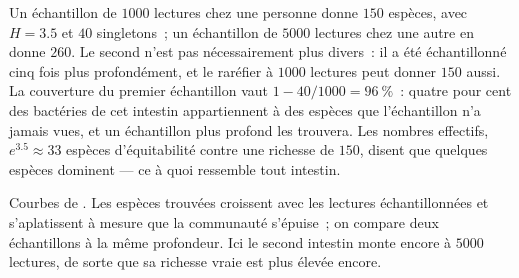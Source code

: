 \begin{example}\label{ex:b3:microbiomes:two-guts}
Un échantillon de $1000$ lectures chez une personne donne $150$
espèces, avec $H = 3.5$ et $40$ singletons~; un échantillon de $5000$
lectures chez une autre en donne $260$. Le second n'est pas
nécessairement plus divers~: il a été échantillonné cinq fois plus
profondément, et le raréfier à $1000$ lectures peut donner $150$ aussi.
La couverture du premier échantillon vaut $1 - 40/1000 =
\qty{96}{\%}$~: quatre pour cent des bactéries de cet intestin
appartiennent à des espèces que l'échantillon n'a jamais vues, et un
échantillon plus profond les trouvera. Les nombres effectifs,
$e^{3.5} \approx 33$ espèces d'équitabilité contre une richesse de
$150$, disent que quelques espèces dominent --- ce à quoi ressemble
tout intestin.
\end{example}

\begin{omfigure}

{\small Courbes de . Les espèces trouvées croissent avec les
lectures échantillonnées et s'aplatissent à mesure que la communauté
s'épuise~; on compare deux échantillons à la même profondeur. Ici le
second intestin monte encore à $5000$ lectures, de sorte que sa
richesse vraie est plus élevée encore.}
\end{omfigure}

